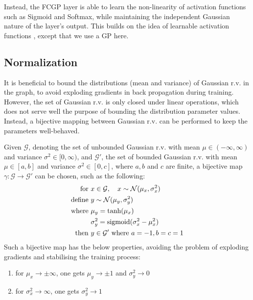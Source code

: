\documentclass{article}
\begin{document}
Instead, the FCGP layer is able to learn the non-linearity of activation functions such as Sigmoid and Softmax, while maintaining the independent Gaussian nature of the layer's output. This builds on the idea of learnable activation functions \cite{learnableActivations}, except that we use a GP here.

\subsection{Normalization}
It is beneficial to bound the distributions (mean and variance) of Gaussian r.v. in the graph, to avoid exploding gradients in back propagation during training. However, the set of Gaussian r.v. is only closed under linear operations, which does not serve well the purpose of bounding the distribution parameter values. Instead, a bijective mapping between Gaussian r.v. can be performed to keep the parameters well-behaved.

Given $\mathcal{G}$, denoting the set of unbounded Gaussian r.v. with mean $\mu\in(-\infty,\infty) $ and variance $\sigma^2\in[0,\infty)$, and $\mathcal{G}'$, the set of bounded Gaussian r.v. with mean $\mu\in[a,b]$ and variance $\sigma^2\in[0,c]$, where $a,b$ and $c$ are finite, a bijective map $\gamma: \mathcal{G} \rightarrow \mathcal{G}'$ can be chosen, such as the following:
\begin{equation}
    \begin{aligned}
        \text{for }&x\in\mathcal{G},\quad x\sim\mathcal{N}(\mu_x,\sigma_x^2) \\
        \text{define }&y\sim\mathcal{N}(\mu_y, \sigma_y^2) \\
        \text{where }&\mu_y = \text{tanh}(\mu_x) \\
                     &\sigma_y^2 = \text{sigmoid}(\sigma_x^2 - \mu_x^2) \\
        \text{then }&y\in\mathcal{G}' \text{ where }a=-1,\space b=c=1
    \end{aligned}
    \label{eq:normalizeMap}
\end{equation}
Such a bijective map has the below properties, avoiding the problem of exploding gradients and stabilising the training process:
\begin{enumerate}
    \item for $\mu_x\rightarrow\pm\infty$, one gets $\mu_y\rightarrow\pm 1$ and $\sigma_y^2\rightarrow 0$
    \item for $\sigma_x^2\rightarrow\infty$, one gets $\sigma_y^2\rightarrow 1$
\end{enumerate}
\end{document}
